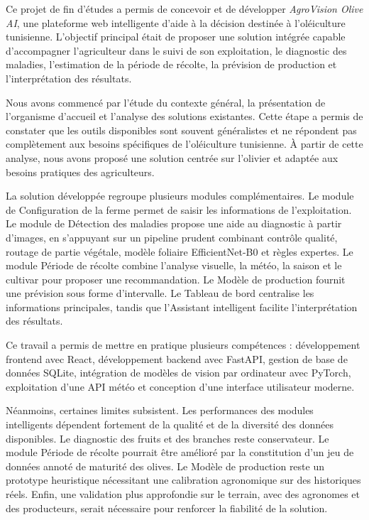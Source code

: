 \documentclass[12pt,a4paper]{report}
\begin{document}
Ce projet de fin d'études a permis de concevoir et de développer \textit{AgroVision Olive AI}, une plateforme web intelligente d'aide à la décision destinée à l'oléiculture tunisienne. L'objectif principal était de proposer une solution intégrée capable d'accompagner l'agriculteur dans le suivi de son exploitation, le diagnostic des maladies, l'estimation de la période de récolte, la prévision de production et l'interprétation des résultats.

Nous avons commencé par l'étude du contexte général, la présentation de l'organisme d'accueil et l'analyse des solutions existantes. Cette étape a permis de constater que les outils disponibles sont souvent généralistes et ne répondent pas complètement aux besoins spécifiques de l'oléiculture tunisienne. À partir de cette analyse, nous avons proposé une solution centrée sur l'olivier et adaptée aux besoins pratiques des agriculteurs.

La solution développée regroupe plusieurs modules complémentaires. Le module de Configuration de la ferme permet de saisir les informations de l'exploitation. Le module de Détection des maladies propose une aide au diagnostic à partir d'images, en s'appuyant sur un pipeline prudent combinant contrôle qualité, routage de partie végétale, modèle foliaire EfficientNet-B0 et règles expertes. Le module Période de récolte combine l'analyse visuelle, la météo, la saison et le cultivar pour proposer une recommandation. Le Modèle de production fournit une prévision sous forme d'intervalle. Le Tableau de bord centralise les informations principales, tandis que l'Assistant intelligent facilite l'interprétation des résultats.

Ce travail a permis de mettre en pratique plusieurs compétences : développement frontend avec React, développement backend avec FastAPI, gestion de base de données SQLite, intégration de modèles de vision par ordinateur avec PyTorch, exploitation d'une API météo et conception d'une interface utilisateur moderne.

Néanmoins, certaines limites subsistent. Les performances des modules intelligents dépendent fortement de la qualité et de la diversité des données disponibles. Le diagnostic des fruits et des branches reste conservateur. Le module Période de récolte pourrait être amélioré par la constitution d'un jeu de données annoté de maturité des olives. Le Modèle de production reste un prototype heuristique nécessitant une calibration agronomique sur des historiques réels. Enfin, une validation plus approfondie sur le terrain, avec des agronomes et des producteurs, serait nécessaire pour renforcer la fiabilité de la solution.
\end{document}
